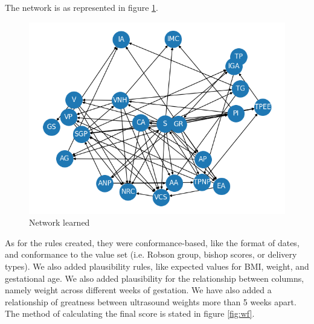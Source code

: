 The network is as represented in figure \ref{fig:network}.
\begin{figure}[htbp]
\centering
\caption{Network learned}\label{fig:network} 
\includegraphics[scale=0.68]{imgs/network.png}
\end{figure}

As for the rules created, they were conformance-based, like the format of dates, and conformance to the value set (i.e. Robson group, bishop scores, or delivery types). We also added plausibility rules, like expected values for BMI, weight, and gestational age. We also added plausibility for the relationship between columns, namely weight across different weeks of gestation. We have also added a relationship of greatness between ultrasound weights more than 5 weeks apart. 
The method of calculating the final score is stated in figure \ref*{fig:wf}.



